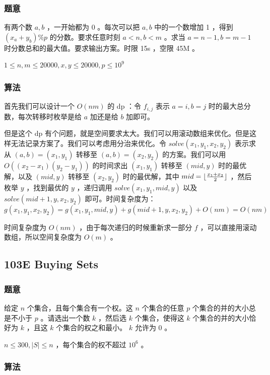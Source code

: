 \documentclass[11pt]{article}
\begin{document}
\subsubsection{题意}
\label{sec-7-8-1}

    有两个数 $a, b$ ，一开始都为 0 。每次可以把 $a, b$ 中的一个数增加 1 ，得到 $(x_a + y_b) \% p$ 的分数。要求任意时刻 $a < n, b < m$ 。求当 $a = n - 1, b = m - 1$ 时分数总和的最大值。要求输出方案。时限 15s ，空限 45M 。

    $1 \leq n, m \leq 20000, x, y \leq 20000, p \leq 10^9$
\subsubsection{算法}
\label{sec-7-8-2}

    首先我们可以设计一个 $O(nm)$ 的 dp ：令 $f_{i, j}$ 表示 $a = i, b= j$ 时的最大总分数，每次转移时枚举是给 $a$ 加还是给 $b$ 加即可。

    但是这个 dp 有个问题，就是空间要求太大。我们可以用滚动数组来优化。但是这样无法记录方案了。我们可以考虑用分治来优化。令 $solve(x_1, y_1, x_2, y_2)$ 表示求从 $(a, b) = (x_1, y_1)$ 转移至 $(a, b) = (x_2, y_2)$ 的方案。我们可以用 $O((x_2 - x_1)(y_2 - y_1))$ 的时间求出 $(x_1, y_1)$ 转移至 $(mid, y)$ 时的最优解，以及 $(mid, y)$ 转移至 $(x_2, y_2)$ 时的最优解，其中 $mid = {\lfloor \frac{x_1 + x_2}{2} \rfloor}$ ，然后枚举 $y$ ，找到最优的 $y$ ，递归调用 $solve(x_1, y_1, mid, y)$ 以及 $solve(mid + 1, y, x_2, y_2)$ 即可。时间复杂度为：
    $$g(x_1, y_1, x_2, y_2) = g(x_1, y_1, mid, y) + g(mid + 1, y, x_2, y_2) + O(nm) = O(nm)$$

    时间复杂度为 $O(nm)$ ，由于每次递归的时候重新求一部分 $f$ ，可以直接用滚动数组，所以空间复杂度为 $O(m)$ 。
\subsection{103E  Buying Sets}
\label{sec-7-9}
\subsubsection{题意}
\label{sec-7-9-1}

    给定 $n$ 个集合，且每个集合有一个权。这 $n$ 个集合的任意 $p$ 个集合的并的大小总是不小于 $p$ 。请选出一个数 $k$ ，然后选 $k$ 个集合，使得这 $k$ 个集合的并的大小恰好为 $k$ ，且这 $k$ 个集合的权之和最小。 $k$ 允许为 0 。

    $n \leq 300, |S| \leq n$ ，每个集合的权不超过 $10^6$ 。
\subsubsection{算法}
\label{sec-7-9-2}
\end{document}
